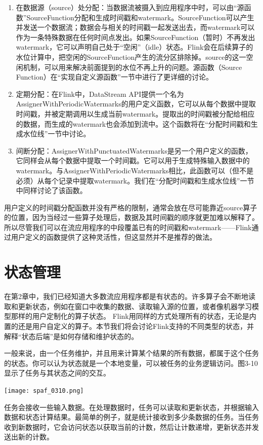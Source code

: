 \documentclass[oneside]{ctexbook}
\begin{document}
\begin{enumerate}
  \item 在数据源（source）处分配：当数据流被摄入到应用程序中时，可以由“源函数”SourceFunction分配和生成时间戳和watermark。SourceFunction可以产生并发送一个数据流；数据会与相关的时间戳一起发送出去，而watermark可以作为一条特殊数据在任何时间点发出。如果SourceFunction（暂时）不再发出watermark，它可以声明自己处于“空闲”（idle）状态。Flink会在后续算子的水位计算中，把空闲的SourceFunction产生的流分区排除掉。source的这一空闲机制，可以用来解决前面提到的水位不再上升的问题。源函数（Source Function）在“实现自定义源函数”一节中进行了更详细的讨论。
  \item 定期分配：在Flink中，DataStream API提供一个名为AssignerWithPeriodicWatermarks的用户定义函数，它可以从每个数据中提取时间戳，并被定期调用以生成当前watermark。提取出的时间戳被分配给相应的数据，而生成的watermark也会添加到流中。这个函数将在“分配时间戳和生成水位线”一节中讨论。
  \item 间断分配：AssignerWithPunctuatedWatermarks是另一个用户定义的函数，它同样会从每个数据中提取一个时间戳。它可以用于生成特殊输入数据中的watermark。与AssignerWithPeriodicWatermarks相比，此函数可以（但不是必须）从每个记录中提取watermark。我们在“分配时间戳和生成水位线”一节中同样讨论了该函数。
\end{enumerate}

用户定义的时间戳分配函数并没有严格的限制，通常会放在尽可能靠近source算子的位置，因为当经过一些算子处理后，数据及其时间戳的顺序就更加难以解释了。所以尽管我们可以在流应用程序的中段覆盖已有的时间戳和watermark——Flink通过用户定义的函数提供了这种灵活性，但这显然并不是推荐的做法。

\section{状态管理}

在第2章中，我们已经知道大多数流应用程序都是有状态的。许多算子会不断地读取和更新状态，例如在窗口中收集的数据、读取输入源的位置，或者像机器学习模型那样的用户定制化的算子状态。 Flink用同样的方式处理所有的状态，无论是内置的还是用户自定义的算子。本节我们将会讨论Flink支持的不同类型的状态，并解释“状态后端”是如何存储和维护状态的。

一般来说，由一个任务维护，并且用来计算某个结果的所有数据，都属于这个任务的状态。你可以认为状态就是一个本地变量，可以被任务的业务逻辑访问。图3-10显示了任务与其状态之间的交互。

\noindent \texttt{[image: spaf\_0310.png]}

任务会接收一些输入数据。在处理数据时，任务可以读取和更新状态，并根据输入数据和状态计算结果。最简单的例子，就是统计接收到多少条数据的任务。当任务收到新数据时，它会访问状态以获取当前的计数，然后让计数递增，更新状态并发送出新的计数。
\end{document}
